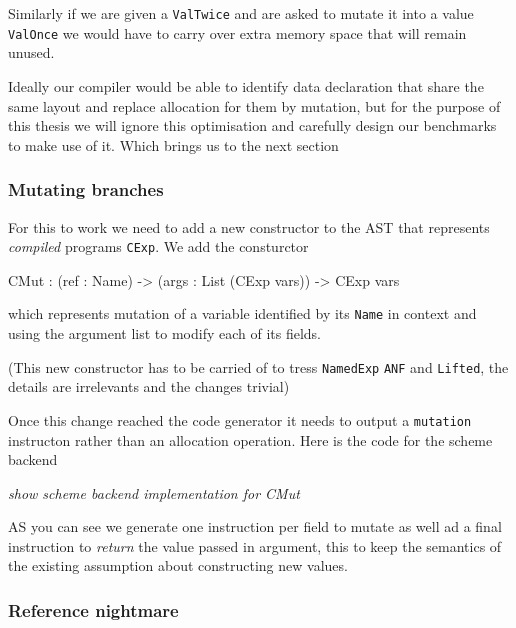 \documentclass[
]{article}
\newenvironment{Shaded}{}{}
\newcommand{\DataTypeTok}[1]{\textcolor[rgb]{0.56,0.13,0.00}{#1}}
\newcommand{\NormalTok}[1]{#1}
\newcommand{\OperatorTok}[1]{\textcolor[rgb]{0.40,0.40,0.40}{#1}}
\newcommand{\OtherTok}[1]{\textcolor[rgb]{0.00,0.44,0.13}{#1}}
\begin{document}
Similarly if we are given a \texttt{ValTwice} and are asked to mutate it
into a value \texttt{ValOnce} we would have to carry over extra memory
space that will remain unused.

Ideally our compiler would be able to identify data declaration that
share the same layout and replace allocation for them by mutation, but
for the purpose of this thesis we will ignore this optimisation and
carefully design our benchmarks to make use of it. Which brings us to
the next section

\hypertarget{mutating-branches}{%
\subsubsection{Mutating branches}\label{mutating-branches}}

For this to work we need to add a new constructor to the AST that
represents \emph{compiled} programs \texttt{CExp}. We add the
consturctor

\begin{Shaded}
\begin{Highlighting}[]
\DataTypeTok{CMut} \OperatorTok{:}\NormalTok{ (ref }\OperatorTok{:} \DataTypeTok{Name}\NormalTok{) }\OtherTok{{-}\textgreater{}}\NormalTok{ (args }\OperatorTok{:} \DataTypeTok{List}\NormalTok{ (}\DataTypeTok{CExp}\NormalTok{ vars)) }\OtherTok{{-}\textgreater{}} \DataTypeTok{CExp}\NormalTok{ vars }
\end{Highlighting}
\end{Shaded}

which represents mutation of a variable identified by its \texttt{Name}
in context and using the argument list to modify each of its fields.

(This new constructor has to be carried of to tress \texttt{NamedExp}
\texttt{ANF} and \texttt{Lifted}, the details are irrelevants and the
changes trivial)

Once this change reached the code generator it needs to output a
\texttt{mutation} instructon rather than an allocation operation. Here
is the code for the scheme backend

\emph{show scheme backend implementation for CMut}

AS you can see we generate one instruction per field to mutate as well
ad a final instruction to \emph{return} the value passed in argument,
this to keep the semantics of the existing assumption about constructing
new values.

\hypertarget{reference-nightmare}{%
\subsubsection{Reference nightmare}\label{reference-nightmare}}
\end{document}
